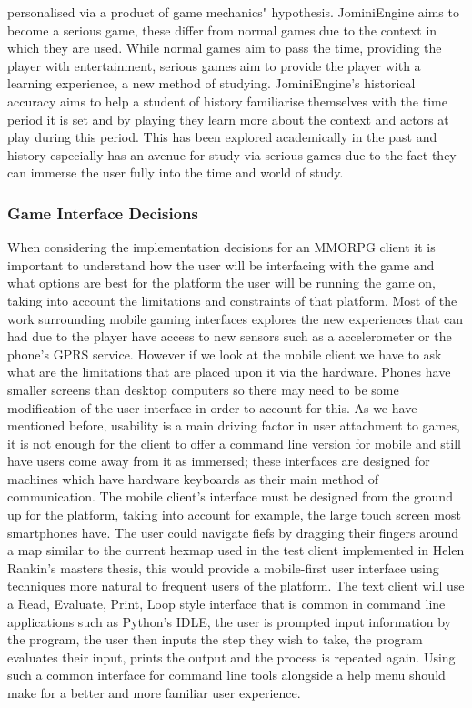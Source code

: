 \documentclass{article}
\begin{document}
personalised via a product of game mechanics" hypothesis. JominiEngine aims to become a serious game, these differ from normal games due to the context in which they are used. While normal games aim to pass the time, providing the player with entertainment, serious games aim to provide the player with a learning experience, a new method of studying. JominiEngine's historical accuracy aims to help a student of history familiarise themselves with the time period it is set and by playing they learn more about the context and actors at play during this period. This has been explored academically in the past\cite{seriousgames} and history especially has an avenue for study via serious games due to the fact they can immerse the user fully into the time and world of study.
	\subsubsection{Game Interface Decisions}
	When considering the implementation decisions for an MMORPG client it is important to understand how the user will be interfacing with the game and what options are best for the platform the user will be running the game on, taking into account the limitations and constraints of that platform. Most of the work surrounding mobile gaming interfaces explores the new experiences that can had due to the player have access to new sensors such as a accelerometer or the phone's GPRS service. However if we look at the mobile client we have to ask what are the limitations that are placed upon it via the hardware. Phones have smaller screens than desktop computers so there may need to be some modification of the user interface in order to account for this. As we have mentioned before, usability is a main driving factor in user attachment to games\cite{Christou:2012:EPP:2367616.2367630}, it is not enough for the client to offer a command line version for mobile and still have users come away from it as immersed; these interfaces are designed for machines which have hardware keyboards as their main method of communication. The mobile client's interface must be designed from the ground up for the platform, taking into account for example, the large touch screen most smartphones have. The user could navigate fiefs by dragging their fingers around a map similar to the current hexmap used in the test client implemented in Helen Rankin's masters thesis\cite{helenrankin}, this would provide a mobile-first user interface using techniques more natural to frequent users of the platform. The text client will use a Read, Evaluate, Print, Loop style interface that is common in command line applications such as Python's IDLE\cite{python}, the user is prompted input information by the program, the user then inputs the step they wish to take, the program evaluates their input, prints the output and the process is repeated again. Using such a common interface for command line tools alongside a help menu should make for a better and more familiar user experience.
\end{document}

